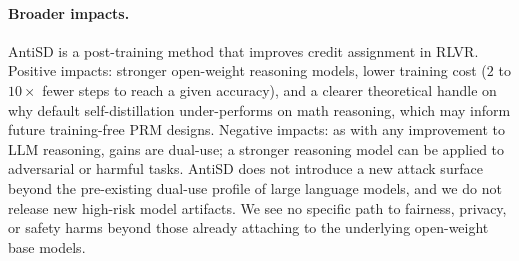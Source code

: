 \documentclass{llmxive}
\begin{document}
\paragraph{Broader impacts.} AntiSD is a post-training method that improves credit assignment in RLVR. Positive impacts: stronger open-weight reasoning models, lower training cost ($2$ to $10\times$ fewer steps to reach a given accuracy), and a clearer theoretical handle on why default self-distillation under-performs on math reasoning, which may inform future training-free PRM designs. Negative impacts: as with any improvement to LLM reasoning, gains are dual-use; a stronger reasoning model can be applied to adversarial or harmful tasks. AntiSD does not introduce a new attack surface beyond the pre-existing dual-use profile of large language models, and we do not release new high-risk model artifacts. We see no specific path to fairness, privacy, or safety harms beyond those already attaching to the underlying open-weight base models.
\end{document}
